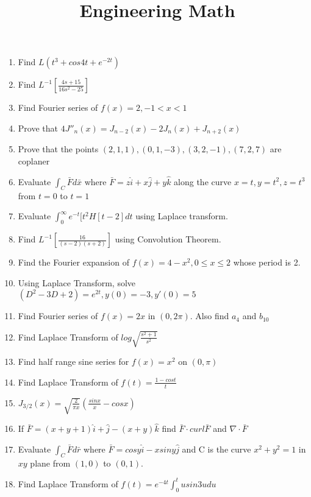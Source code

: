 \documentclass[17pt]{extarticle}
\title{\large Engineering Math}
\begin{document}
\maketitle

\begin{enumerate}
    \item Find $ L(t^3 + cos 4t + e^{-2t} ) $
    \item Find $ L^{-1} \left[ \frac{4s+15}{16s^2-25} \right] $
    \item Find Fourier series of $ f(x) = 2, -1<x<1 $
    \item Prove that $ 4J''_n(x) =  J_{n-2}(x) - 2J_n(x) + J_{n+2}(x)  $
    \item Prove that the points $(2,1,1), (0,1,-3), (3,2,-1), (7,2,7)  $
    are coplaner
    \item Evaluate $\int_C \bar{F}d\bar{x}$ where $\bar{F}=z\hat{i}+x\hat{j}+y\hat{k}$ along the curve $x=t, y=t^2, z=t^3$ from $t=0$ to $t=1$
    \item Evaluate $ \int_0^{\infty} e^{-t}[t^2H[t-2]dt$ using Laplace transform.
    \item Find $ L^{-1} \left[ \frac{16}{(s-2)(s+2)} \right] $ using Convolution Theorem.
    \item Find the Fourier expansion of $ f(x) = 4-x^2, 0 \leq x \leq 2 $ whose period is 2.
    \item Using Laplace Transform, solve $(D^2 - 3D + 2)= e^{2t},y(0)=-3,y'(0)=5 $
    \item  Find Fourier series of $ f(x) = 2x$ in $ (0,2\pi). $ Also find $a_4$ and $b_{10}$ 
    \item Find Laplace Transform of $log \sqrt{\frac{s^2+1}{s^2}}$
    \item Find half range sine series for $f(x) = x^2$ on $(0,\pi) $
    \item Find Laplace Transform of $ f(t) = \frac{1 - cos t}{t}$
    \item $ J_{3/2}(x) = \sqrt{\frac{2}{\pi x}} \left( \frac{sin x}{x} - cos x\right) $
    \item If $\bar{F} =(x+y+1)\hat{i}+\hat{j}-(x+y)\hat{k} $ find $\bar{F} \cdot curl \bar{F}$ and $ \nabla \cdot \bar{F}$
    \item Evaluate $ \int_C \bar{F}d\bar{r} $ where $ \bar{F} = cosy \hat{i} - xsiny \hat{j} $ and C is the curve $ x^2 + y^2 = 1 $ in $xy$ plane from $(1,0)$  to $(0,1)$.
    \item Find Laplace Transform of $f(t) =  e^{-4t} \int_0^t usin3udu $
    

\end{enumerate}
\end{document}

